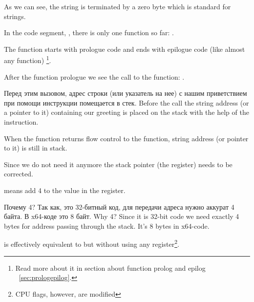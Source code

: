 {As we can see, the string is terminated by a zero byte which is standard for \CCpp strings.}

{In the code segment, , there is only one function so far}: \main.

{The function \main starts with prologue code and ends with epilogue code (like almost any function)}
\footnote{
{Read more about it in section about function prolog and epilog}
~\ref{sec:prologepilog}.}.

{After the function prologue we see the call to the \printf function}: . 

\IFRU
{Перед этим вызовом, адрес строки (или указатель на нее) с нашим приветствием при помощи инструкции \PUSH помещается в стек.}
{Before the call the string address (or a pointer to it) containing our greeting is placed on the stack with the help of the \PUSH instruction.}

{When the \printf function returns flow control to the \main function, string address (or pointer to it) is still in stack.}

{Since we do not need it anymore the stack pointer (the \ESP register) needs to be corrected.}

 
{means add 4 to the value in the \ESP register.}

\IFRU
{Почему 4? Так как, это 32-битный код, для передачи адреса нужно аккурат 4 байта. В x64-коде это 8 байт.}
{Why 4? Since it is 32-bit code we need exactly 4 bytes for address passing through the stack. 
It's 8 bytes in x64-code.}

 
{is effectively equivalent to  but without using any register\footnote{CPU flags, however, are modified}.}


